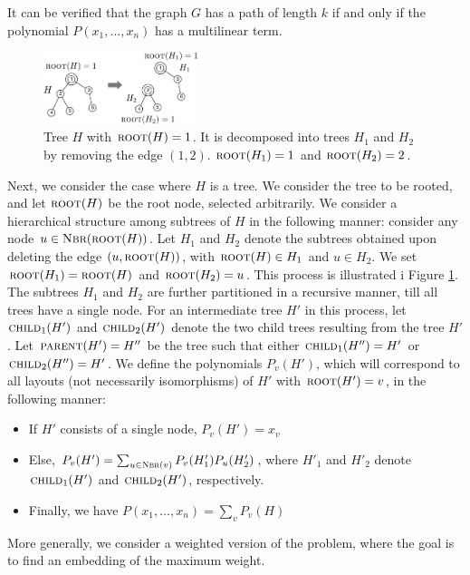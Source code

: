 It can be verified that the graph $G$ has a path of length $k$ if and only if the
polynomial $P(x_1,\ldots,x_n)$ has a multilinear term.


\begin{figure}[h]
\includegraphics[width=0.4\textwidth]{img/trees.pdf}
\caption{
\small
Tree $H$ with $\textsc{root}(H)=1$. It is decomposed into trees $H_1$ and $H_2$ by
removing the edge $(1, 2)$. $\textsc{root}(H_1)=1$ and $\textsc{root}(H_2)=2$.
}
\label{fig:trees}
\end{figure}
Next, we consider the case where $H$ is a tree. We consider the tree to be rooted,
and let $\textsc{root}(H)$ be the root node, selected arbitrarily. We consider a hierarchical
structure among subtrees of $H$ in the following manner: consider any node $u\in\textsc{Nbr}(\textsc{root}(H))$.
Let $H_1$ and $H_2$ denote the subtrees obtained upon deleting the edge $(u, \textsc{root}(H))$,
with $\textsc{root}(H)\in H_1$ and $u\in H_2$. We set $\textsc{root}(H_1)=\textsc{root}(H)$ and $\textsc{root}(H_2)=u$.
This process is illustrated i Figure \ref{fig:trees}.
The subtrees $H_1$ and $H_2$ are further partitioned in a recursive manner, till
all trees have a single node. For an intermediate tree $H'$ in this process,
let $\textsc{child}_1(H')$ and $\textsc{child}_2(H')$ denote the two child trees
resulting from the tree $H'$. Let $\textsc{parent}(H')=H''$ be the tree such that
either $\textsc{child}_1(H'')= H'$ or $\textsc{child}_2(H'') = H'$.
We define the polynomials $P_v(H')$, which will correspond to all layouts (not necessarily
isomorphisms) of $H'$ with $\textsc{root}(H')=v$, in the following manner:
\begin{itemize}
\item
If $H'$ consists of a single node, $P_v(H') = x_v$
\item
Else, 
$P_v(H') = \sum_{u\in\textsc{Nbr}(v)} P_v(H'_1)P_u(H'_2)$, where
$H'_1$ and $H'_2$ denote $\textsc{child}_1(H')$ and $\textsc{child}_2(H')$, respectively.
\item
Finally, we have
$P(x_1,\ldots, x_n)= \sum_v P_v(H)$
\end{itemize}

More generally, we consider a weighted version of the problem, where the goal is to
find an embedding of the maximum weight. 

